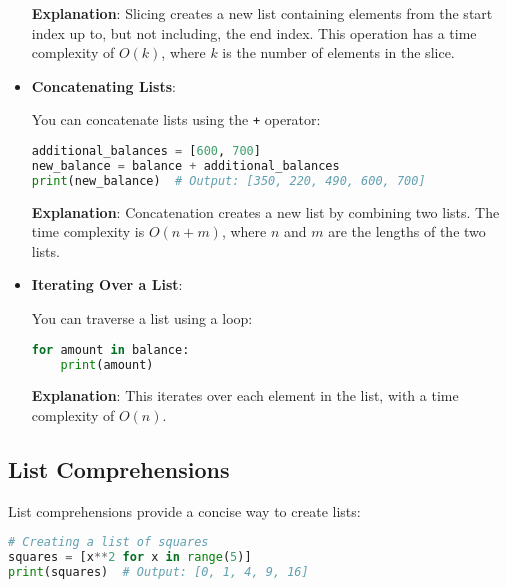 \begin{itemize}
    \textbf{Explanation}: Slicing creates a new list containing elements from the start index up to, but not including, the end index. This operation has a time complexity of \(O(k)\), where \(k\) is the number of elements in the slice.

    \item \textbf{Concatenating Lists}:

    You can concatenate lists using the \texttt{+} operator:

    \begin{fullwidth}
    \begin{lstlisting}[language=Python, caption=Concatenating lists]
additional_balances = [600, 700]
new_balance = balance + additional_balances
print(new_balance)  # Output: [350, 220, 490, 600, 700]
    \end{lstlisting}
    \end{fullwidth}

    \textbf{Explanation}: Concatenation creates a new list by combining two lists. The time complexity is \(O(n + m)\), where \(n\) and \(m\) are the lengths of the two lists.

    \item \textbf{Iterating Over a List}:

    You can traverse a list using a loop:

    \begin{fullwidth}
    \begin{lstlisting}[language=Python, caption=Iterating over a list]
for amount in balance:
    print(amount)
    \end{lstlisting}
    \end{fullwidth}

    \textbf{Explanation}: This iterates over each element in the list, with a time complexity of \(O(n)\).

\end{itemize}

\subsection{List Comprehensions}\label{subsec:list_comprehensions}

List comprehensions provide a concise way to create lists:

\begin{fullwidth}
\begin{lstlisting}[language=Python, caption=Using list comprehensions]
# Creating a list of squares
squares = [x**2 for x in range(5)]
print(squares)  # Output: [0, 1, 4, 9, 16]
\end{lstlisting}
\end{fullwidth}

